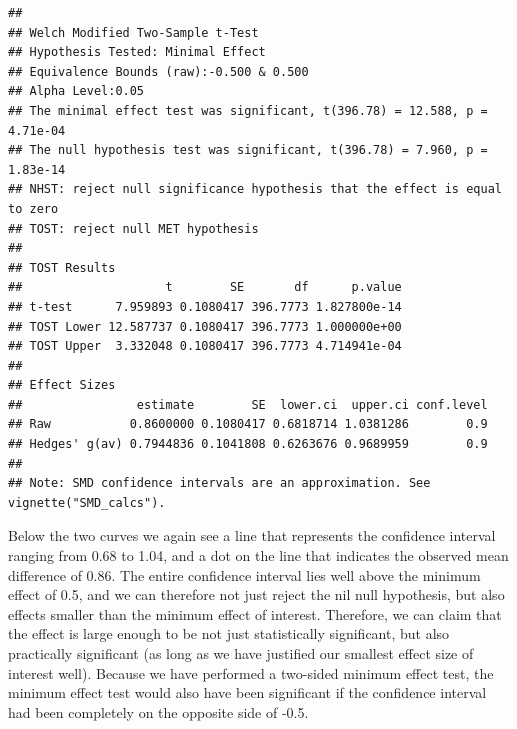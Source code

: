 \documentclass[
  oneside]{krantz}
\begin{document}
\begin{verbatim}
## 
## Welch Modified Two-Sample t-Test
## Hypothesis Tested: Minimal Effect
## Equivalence Bounds (raw):-0.500 & 0.500
## Alpha Level:0.05
## The minimal effect test was significant, t(396.78) = 12.588, p = 4.71e-04
## The null hypothesis test was significant, t(396.78) = 7.960, p = 1.83e-14
## NHST: reject null significance hypothesis that the effect is equal to zero 
## TOST: reject null MET hypothesis
## 
## TOST Results 
##                    t        SE       df      p.value
## t-test      7.959893 0.1080417 396.7773 1.827800e-14
## TOST Lower 12.587737 0.1080417 396.7773 1.000000e+00
## TOST Upper  3.332048 0.1080417 396.7773 4.714941e-04
## 
## Effect Sizes 
##                estimate        SE  lower.ci  upper.ci conf.level
## Raw           0.8600000 0.1080417 0.6818714 1.0381286        0.9
## Hedges' g(av) 0.7944836 0.1041808 0.6263676 0.9689959        0.9
## 
## Note: SMD confidence intervals are an approximation. See vignette("SMD_calcs").
\end{verbatim}

Below the two curves we again see a line that represents the confidence interval ranging from 0.68 to 1.04, and a dot on the line that indicates the observed mean difference of 0.86. The entire confidence interval lies well above the minimum effect of 0.5, and we can therefore not just reject the nil null hypothesis, but also effects smaller than the minimum effect of interest. Therefore, we can claim that the effect is large enough to be not just statistically significant, but also practically significant (as long as we have justified our smallest effect size of interest well). Because we have performed a two-sided minimum effect test, the minimum effect test would also have been significant if the confidence interval had been completely on the opposite side of -0.5.
\end{document}
